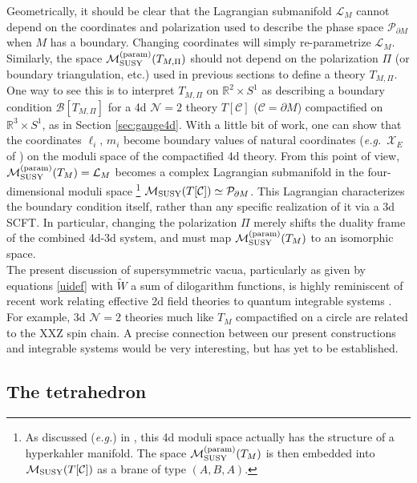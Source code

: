 \documentclass[hyper,letterpaper]{JHEP3}
\numberwithin{equation}{section}
\newcommand{\wt}{\widetilde}
\newcommand{\eg}{\emph{e.g.}}
\newcommand{\R}{{\mathbb R}}
\newcommand{\pd}{\partial}
\newcommand{\CB}{\mathcal{B}}
\newcommand{\CC}{\mathcal{C}}
\newcommand{\CL}{\mathcal{L}}
\newcommand{\CM}{\mathcal{M}}
\newcommand{\CN}{\mathcal{N}}
\newcommand{\CP}{\mathcal{P}}
\newcommand{\CX}{\mathcal{X}}
\begin{document}
Geometrically, it should be clear that the Lagrangian submanifold $\CL_M$ cannot depend on the coordinates and polarization used to describe the phase space $\CP_{\pd M}$ when $M$ has a boundary. Changing coordinates will simply re-parametrize $\CL_M$. Similarly, the space $\CM_{\rm SUSY}^{(\rm param)}(T_{M,\Pi})$ should not depend on the polarization $\Pi$ (or boundary triangulation, etc.) used in previous sections to define a theory $T_{M,\Pi}$. One way to see this is to interpret $T_{M,\Pi}$ on $\R^2\times S^1$ as describing a boundary condition $\CB[T_{M,\Pi}]$ for a 4d $\CN=2$ theory $T[\CC]$ ($\CC=\pd M$) compactified on $\R^3\times S^1$, as in Section \ref{sec:gauge4d}. 
With a little bit of work, one can show that the coordinates $\ell_i,\, m_i$ become boundary values of natural coordinates (\eg\ $\CX_E$ of \cite{GMN, GMNII}) on the moduli space of the compactified 4d theory.
From this point of view, $\CM_{\rm SUSY}^{(\rm param)}(T_M)=\CL_M$ becomes a complex Lagrangian submanifold in the four-dimensional moduli space%
%
\footnote{As discussed (\eg) in \cite{GMN, GMNII}, this 4d moduli space actually has the structure of a hyperkahler manifold. The space $\CM_{\rm SUSY}^{(\rm param)}(T_M)$ is then embedded into $\CM_{\rm SUSY}(T[\CC])$ as a brane of type $(A,B,A)$.}
%
$\CM_{\rm SUSY}(T[\CC])\simeq \CP_{\pd M}$. This Lagrangian characterizes the boundary condition itself, rather than any specific realization of it via a 3d SCFT. In particular, changing the polarization $\Pi$ merely shifts the duality frame of the combined 4d-3d system, and must map $\CM_{\rm SUSY}^{(\rm param)}(T_M)$ to an isomorphic space. \\



The present discussion of supersymmetric vacua, particularly as given by equations \eqref{uidef} with $\wt W$ a sum of dilogarithm functions, is highly reminiscent of recent work relating effective 2d field theories to  quantum integrable systems \cite{NS-I, NShatashvili, NRS}. For example, 3d $\CN=2$ theories much like $T_{M}$ compactified on a circle are related to the XXZ spin chain. A precise connection between our present constructions and integrable systems would be very interesting, but has yet to be established.


\subsection{The tetrahedron}
\end{document}
